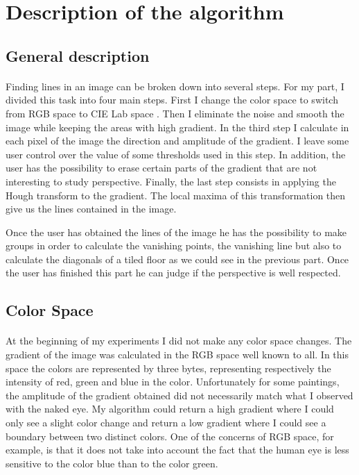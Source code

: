 \documentclass[11pt]{article}
\begin{document}
	\section{Description of the algorithm}
	

	\subsection{General description}
	
	\paragraph{}
	Finding lines in an image can be broken down into several steps. For my part, I divided this task into four main steps. First I change the color space to switch from RGB space to CIE Lab space \cite{cielab}. Then I eliminate the noise and smooth the image while keeping the areas with high gradient. In the third step I calculate in each pixel of the image the direction and amplitude of the gradient. I leave some user control over the value of some thresholds used in this step. In addition, the user has the possibility to erase certain parts of the gradient that are not interesting to study perspective. Finally, the last step consists in applying the Hough transform to the gradient. The local maxima of this transformation then give us the lines contained in the image.
	
	Once the user has obtained the lines of the image he has the possibility to make groups in order to calculate the vanishing points, the vanishing line but also to calculate the diagonals of a tiled floor as we could see in the previous part. Once the user has finished this part he can judge if the perspective is well respected.
	
	\subsection{Color Space}
	
	\paragraph{}
	At the beginning of my experiments I did not make any color space changes. The gradient of the image was calculated in the RGB space well known to all. In this space the colors are represented by three bytes, representing respectively the intensity of red, green and blue in the color. Unfortunately for some paintings, the amplitude of the gradient obtained did not necessarily match what I observed with the naked eye. My algorithm could return a high gradient where I could only see a slight color change and return a low gradient where I could see a boundary between two distinct colors. One of the concerns of RGB space, for example, is that it does not take into account the fact that the human eye is less sensitive to the color blue than to the color green.
	
\end{document}
